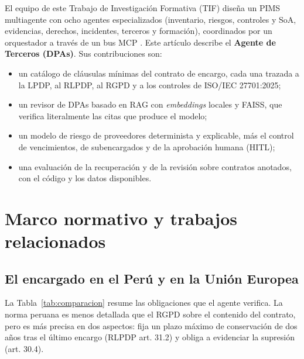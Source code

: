 \documentclass[conference]{IEEEtran}
\begin{document}
El equipo de este Trabajo de Investigación Formativa (TIF) diseña un PIMS multiagente con ocho agentes especializados (inventario, riesgos, controles y SoA, evidencias, derechos, incidentes, terceros y formación), coordinados por un orquestador a través de un bus MCP \cite{mcp2025,wang2024agents}. Este artículo describe el \textbf{Agente de Terceros (DPAs)}. Sus contribuciones son:
\begin{itemize}
  \item un catálogo de \NumClausulas{} cláusulas mínimas del contrato de encargo, cada una trazada a la LPDP, al RLPDP, al RGPD y a los controles de ISO/IEC 27701:2025;
  \item un revisor de DPAs basado en RAG con \emph{embeddings} locales y FAISS, que verifica literalmente las citas que produce el modelo;
  \item un modelo de riesgo de proveedores determinista y explicable, más el control de vencimientos, de subencargados y de la aprobación humana (HITL);
  \item una evaluación de la recuperación y de la revisión sobre contratos anotados, con el código y los datos disponibles.
\end{itemize}

\section{Marco normativo y trabajos relacionados}

\subsection{El encargado en el Perú y en la Unión Europea}
La Tabla~\ref{tab:comparacion} resume las obligaciones que el agente verifica. La norma peruana es menos detallada que el RGPD sobre el contenido del contrato, pero es más precisa en dos aspectos: fija un plazo máximo de conservación de dos años tras el último encargo (RLPDP art. 31.2) y obliga a evidenciar la supresión (art. 30.4).
\end{document}

